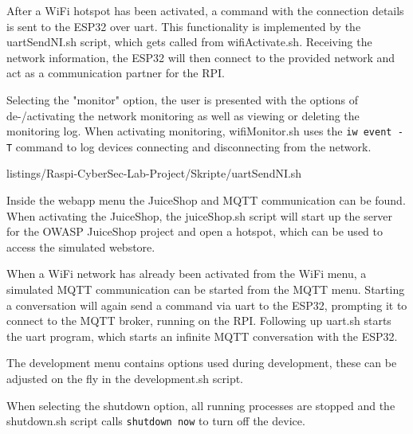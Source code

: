 After a WiFi hotspot has been activated, a command with the connection details is sent to the ESP32 over uart.
This functionality is implemented by the uartSendNI.sh script, which gets called from wifiActivate.sh.
Receiving the network information, the ESP32 will then connect to the provided network and act as a communication partner for the RPI.

Selecting the "monitor" option, the user is presented with the options of de-/activating the network monitoring as well as viewing or deleting the monitoring log.
When activating monitoring, wifiMonitor.sh uses the \lstinline[]|iw event -T| command to log devices connecting and disconnecting from the network.


    {listings/Raspi-CyberSec-Lab-Project/Skripte/uartSendNI.sh}

Inside the webapp menu the JuiceShop and MQTT communication can be found.
When activating the JuiceShop, the juiceShop.sh script will start up the server for the OWASP JuiceShop project and open a hotspot, which can be used to access the simulated webstore.

When a WiFi network has already been activated from the WiFi menu, a simulated MQTT communication can be started from the MQTT menu.
Starting a conversation will again send a command via uart to the ESP32, prompting it to connect to the MQTT broker, running on the RPI.
Following up uart.sh starts the uart program, which starts an infinite MQTT conversation with the ESP32.

The development menu contains options used during development, these can be adjusted on the fly in the development.sh script.

When selecting the shutdown option, all running processes are stopped and the shutdown.sh script calls \lstinline[]|shutdown now| to turn off the device.




